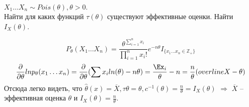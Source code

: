 \begin{example}
$X_1 \ldots X_n \sim Pois(\theta), \theta > 0.$\\
Найти для каких функций $\tau(\theta)$ существуют эффективные оценки. Найти $I_X(\theta)$.
\end{example}
$$
P_\theta(X_1 \ldots X_n) = \frac{\theta^{\sum\limits_{i = 1}^n x_i}}{\prod\limits_{i = 1}^n x_i!}e^{-n\theta}I_{\{x_1 \ldots x_n \in \mathbb{Z}_+\}}
$$
$$
\frac{\partial}{\partial\theta}lnp_\theta(x_1 \ldots x_n) = \frac{\partial}{\partial\theta}(\sum x_i ln(\theta) - n\theta) = \frac{\Ex_i}{\theta} - n = \frac{n}{\theta}(overline{X} - \theta)
$$
Отсюда легко видеть, что $\hat\theta(x) = \overline{X}, \tau{\theta} = \theta, c^{-1}(\theta) = \frac{n}{\theta} = I_X(\theta)$ $\Rightarrow$ $\overline{X}$ -- эффективная оценка $\theta$ и $I_X(\theta) = \frac{n}{\theta}$. 